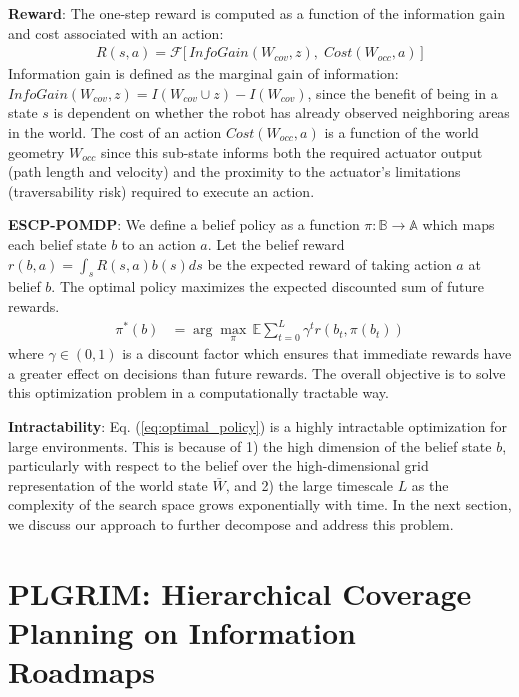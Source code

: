 \documentclass[letterpaper]{article} %
\newcommand{\ph}[1]{{\textbf{#1}:}} %
\begin{document}
\ph{Reward} The one-step reward is computed as a function of the information gain and cost associated with an action:
\begin{align}
    {R}(s, a) = \mathcal{F}\Big[\, \textit{InfoGain}(W_{cov}, z), \; \textit{Cost}(W_{occ}, a) \, \Big]%
\end{align}
Information gain is defined as the marginal gain of information: $\textit{InfoGain}(W_{cov}, z) = I(W_{cov} \cup z) - I(W_{cov})$, since the benefit of being in a state $s$ is dependent on whether the robot has already observed neighboring areas in the world. The cost of an action $Cost(W_{occ}, a)$ is a function of the world geometry $W_{occ}$ since this sub-state informs both the required actuator output (path length and velocity) and the proximity to the actuator's limitations (traversability risk) required to execute an action.

\ph{ESCP-POMDP} We define a belief policy as a function $\pi : \mathbb{B} \rightarrow \mathbb{A}$ which maps each belief state $b$ to an action $a$.  Let the belief reward $r(b,a)=\int_s R(s,a)b(s)ds$ be the expected reward of taking action $a$ at belief $b$.  The optimal policy maximizes the expected discounted sum of future rewards.
\begin{align}
  \pi^*(b) &= \arg\max_\pi \, \mathbb{E} \sum_{t=0}^{L} \gamma^t r(b_t, \pi(b_t)) 
  \label{eq:optimal_policy}
\end{align}
where $\gamma \in (0,1)$ is a discount factor which ensures that immediate rewards have a greater effect on decisions than future rewards. The overall objective is to solve this optimization problem in a computationally tractable way.

\ph{Intractability} 
Eq. (\ref{eq:optimal_policy}) is a highly intractable optimization for large environments. This is because of 1) the high dimension of the belief state $b$, particularly with respect to the belief over the high-dimensional grid representation of the world state $\bar{W}$, and 2) the large timescale $L$ as the complexity of the search space grows exponentially with time. In the next section, we discuss our approach to further decompose and address this problem.


\section{PLGRIM: Hierarchical Coverage Planning on Information Roadmaps}
\label{sec:plgrim}
\end{document}
